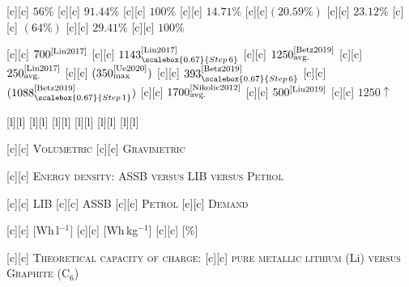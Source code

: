[c][c] {\tiny $56\%$}
[c][c] {\tiny $91.44\%$}
[c][c] {\tiny $100\%$}
[c][c] {\tiny $14.71\%$}
[c][c]{\tiny $(20.59\%)$}
[c][c] {\tiny $23.12\%$}
[c][c] {\tiny $(64\%)$}
[c][c] {\tiny $29.41\%$}
[c][c] {\tiny $100\%$}

[c][c] {\tiny $700^{\text{\cite{Lin2017}}}$}
[c][c] {\tiny $1143^{\text{\cite{Lin2017}}}_{\scalebox{0.67}{Step\,6}}$}
[c][c] {\tiny $1250^{\text{\cite{Betz2019}}}_{\text{avg.}}$}
[c][c] {\tiny $250^{\text{\cite{Lin2017}}}_{\text{avg.}}$}
[c][c] {\tiny $(350^{\text{\cite{Ue2020}}}_{\max})$}
[c][c] {\tiny $ 393^{\text{\cite{Betz2019}}}_{\scalebox{0.67}{Step\,6}}$}
[c][c] {\tiny $(1088^{\text{\cite{Betz2019}}}_{\scalebox{0.67}{Step\,1}})$}
[c][c] {\tiny $1700^{\text{\cite{Nikolic2012}}}_{\text{avg.}}$}
[c][c] {\tiny $500^{\text{\cite{Liu2019}}}$}
[c][c] {\tiny $1250\!\uparrow$}

[l][l] {}
[l][l] {}
[l][l] {}
[l][l] {}
[l][l] {}
[l][l] {}


[c][c] {\tiny \textsc{Volumetric}}
[c][c] {\tiny \textsc{Gravimetric}}

[c][c] {\scriptsize
	\textsc{Energy density}: ASSB \textsc{versus} LIB \textsc{versus} \textsc{Petrol}}

[c][c] {\scriptsize LIB}
[c][c] {\scriptsize ASSB}
[c][c] {\scriptsize \textsc{Petrol}}
[c][c] {\scriptsize \textsc{Demand}}

[c][c] {\tiny [Wh\,l$^{-1}$]}
[c][c] {\tiny [Wh\,kg$^{-1}$]}
[c][c] {\tiny [$\%$]}

[c][c]  {\scriptsize \textsc{Theoretical capacity of charge}:}
[c][c] {\scriptsize
	\textsc{pure} \textsc{metallic lithium} (Li)
	\textsc{versus Graphite (C$_{6}$)}}

